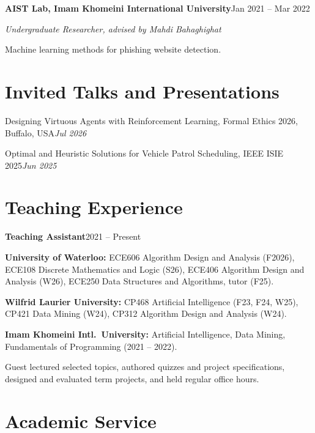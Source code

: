 \documentclass[letterpaper,11pt]{article}
\newcommand{\role}[2]{\textbf{#1}\hfill{#2}\par}
\newcommand{\sub}[2]{#1\hfill\textit{#2}\par}
\begin{document}
\role{AIST Lab, Imam Khomeini International University}{Jan 2021 -- Mar 2022}
\textit{Undergraduate Researcher, advised by Mahdi Bahaghighat}
\begin{tight}
  \item Machine learning methods for phishing website detection.
\end{tight}


\section{Invited Talks and Presentations}

\sub{Designing Virtuous Agents with Reinforcement Learning, Formal Ethics 2026, Buffalo, USA}{Jul 2026}
\sub{Optimal and Heuristic Solutions for Vehicle Patrol Scheduling, IEEE ISIE 2025}{Jun 2025}

\section{Teaching Experience}

\role{Teaching Assistant}{2021 -- Present}
\begin{tight}
  \item \textbf{University of Waterloo:} ECE606 Algorithm Design and Analysis (F2026), ECE108 Discrete Mathematics and Logic (S26), ECE406 Algorithm Design and Analysis (W26), ECE250 Data Structures and Algorithms, tutor (F25).
  \item \textbf{Wilfrid Laurier University:} CP468 Artificial Intelligence (F23, F24, W25), CP421 Data Mining (W24), CP312 Algorithm Design and Analysis (W24).
  \item \textbf{Imam Khomeini Intl.\ University:} Artificial Intelligence, Data Mining, Fundamentals of Programming (2021 -- 2022).
  \item Guest lectured selected topics, authored quizzes and project specifications, designed and evaluated term projects, and held regular office hours.
\end{tight}

\section{Academic Service}
\end{document}
